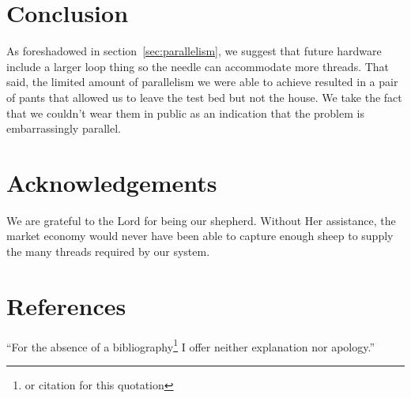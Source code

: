 \documentclass[letterpaper,12pt]{article}
\begin{document}
\begin{multicols}{2}
\section{Conclusion}
As foreshadowed in section~\ref{sec:parallelism}, we suggest that future hardware include a larger loop thing so the needle can accommodate more threads.
That said, the limited amount of parallelism we were able to achieve resulted in a pair of pants that allowed us to leave the test bed but not the house.
We take the fact that we couldn't wear them in public as an indication that the problem is embarrassingly parallel.

\section*{Acknowledgements}
We are grateful to the Lord for being our shepherd.
Without Her assistance, the market economy would never have been able to capture enough sheep to supply the many threads required by our system.

\section*{References}
``For the absence of a bibliography\footnote{or citation for this quotation} I offer neither explanation nor apology.''

\end{multicols}
\end{document}
